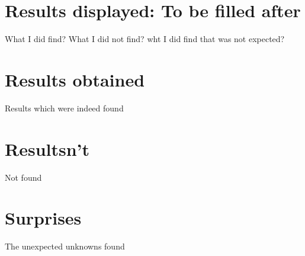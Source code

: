 \section{Results displayed: To be filled after}
What I did find?
What I did not find?
wht I did find that was not expected?

\section{Results obtained}
Results which were indeed found

\section{Resultsn't}
Not found

\section{Surprises}
The unexpected unknowns found
%
%
%
%
%
%
